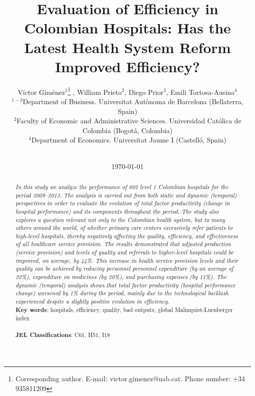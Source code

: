 \documentclass[11pt,a4paper,oneside]{article}
\begin{document}
	

	\title{\textbf{Evaluation of Efficiency in Colombian Hospitals: Has the Latest Health System Reform Improved Efficiency?\\}}
		\author{V\'ictor Gim\'enez$^{1}$\footnote{Corresponding author. E-mail: victor.gimenez@uab.cat. Phone number: +34 935811209} , William Prieto$^{2}$, Diego Prior$^{3}$, Emili Tortosa-Ausina$^{4}$\\
		\small{$^{1-3}$Department of Business. Universitat Aut\`onoma de Barcelona (Bellaterra, Spain)}\\
		 \small{$^{2}$Faculty of Economic and Administrative Sciences. Universidad Cat\'olica de Colombia (Bogot\'a, Colombia)}\\
		 \small{$^{4}$Department of Economics. Universitat Jaume I (Castell\'o, Spain)}\\ \\
		}	
	\date{\today\\}
	\maketitle
	



\begin{abstract}
	
\textsl{In this study we analyze the performance of 602 level 1 Colombian hospitals for the period 2009--2013. The analysis is carried out from both static and dynamic (temporal) perspectives in order to evaluate the evolution of total factor productivity (change in hospital performance) and its components throughout the period. The study also explores a question relevant not only to the Colombian health system, but to many others around the world, of whether primary care centers excessively refer patients to high-level hospitals, thereby negatively affecting the quality, efficiency, and effectiveness of all healthcare service provision. The results demonstrated that adjusted production (service provision) and levels of quality and referrals to higher-level hospitals could be improved, on average, by 44\%. This increase in health service provision levels and their quality can be achieved by reducing personnel personnel expenditure (by an average of 22\%), expenditure on medicines (by 20\%), and purchasing expenses (by 11\%). The dynamic (temporal) analysis shows that total factor productivity (hospital performance change) worsened by 1\% during the period, mainly due to the technological backlash experienced despite a slightly  positive evolution in efficiency.} \\

\noindent
\textbf{Key words}: hospitals, efficiency, quality, bad outputs, global 
Malmquist-Luenberger index \\ \\
\textbf{JEL Classifications}: C61, H51, I18

\end{abstract}
	
\end{document}
